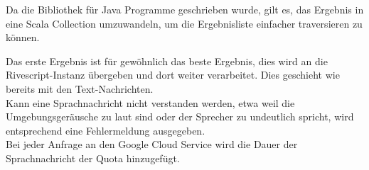 
Da die Bibliothek für Java Programme geschrieben wurde, gilt es, das Ergebnis in eine Scala Collection umzuwandeln, um die Ergebnisliste einfacher traversieren zu können.

Das erste Ergebnis ist für gewöhnlich das beste Ergebnis, dies wird an die Rivescript-Instanz übergeben und dort weiter verarbeitet. Dies geschieht wie bereits mit den Text-Nachrichten. \\
Kann eine Sprachnachricht nicht verstanden werden, etwa weil die Umgebungsgeräusche zu laut sind oder der Sprecher zu undeutlich spricht, wird entsprechend eine Fehlermeldung ausgegeben. \\
Bei jeder Anfrage an den Google Cloud Service wird die Dauer der Sprachnachricht der Quota hinzugefügt.

